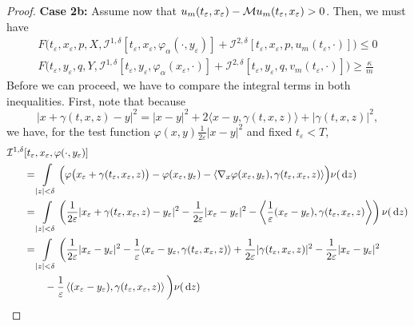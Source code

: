 \begin{proof}
    \textbf{Case 2b:} Assume now that $u_m(t_\varepsilon, x_\varepsilon) - \mathcal{M} u_m(t_\varepsilon, x_\varepsilon) > 0$. Then, we must have 
    \begin{align}
        F \big( t_\varepsilon, x_\varepsilon, p, X, \mathcal I^{1,\delta}[t_\varepsilon, x_\varepsilon, \varphi_\alpha(\cdot, y_\varepsilon)] + \mathcal I^{2,\delta}[t_\varepsilon, x_\varepsilon, p, u_m(t_\varepsilon, \cdot)] \big) \leq 0 \label{eqn: (44) in Seydel} \\
        F \big( t_\varepsilon, y_\varepsilon, q, Y, \mathcal I^{1,\delta}[t_\varepsilon, y_\varepsilon, \varphi_\alpha(x_\varepsilon, \cdot)] + \mathcal I^{2,\delta}[t_\varepsilon, y_\varepsilon, q, v_m(t_\varepsilon, \cdot)] \big) \geq \frac{\kappa}{m} \label{eqn: (45) in Seydel}
    \end{align}
    Before we can proceed, we have to compare the integral terms in both inequalities. First, note that because
    \begin{equation*}
        |x+\gamma(t,x,z)-y|^2 = |x-y|^2 + 2\langle x-y,\gamma(t,x,z)\rangle + |\gamma(t,x,z)|^2,
    \end{equation*}
    we have, for the test function $\varphi(x,y) \frac{1}{2\varepsilon}|x-y|^2$ and fixed $t_\varepsilon < T$,
    \begin{align*}
        \mathcal{I}^{1,\delta} &[t_\varepsilon, x_\varepsilon, \varphi(\cdot, y_\varepsilon)]\\
        & = \int\limits_{|z|<\delta} \Big( \varphi \big( x_\varepsilon + \gamma(t_\varepsilon,x_\varepsilon,z) \big) - \varphi(x_\varepsilon,y_\varepsilon) - \langle \nabla_x \varphi(x_\varepsilon,y_\varepsilon), \gamma(t_\varepsilon,x_\varepsilon,z) \rangle \Big) \nu(\diff z) \\
        &= \int\limits_{|z|<\delta} \left( \frac{1}{2\varepsilon} |x_\varepsilon + \gamma(t_\varepsilon,x_\varepsilon,z) - y_\varepsilon|^2 - \frac{1}{2\varepsilon} |x_\varepsilon - y_\varepsilon|^2 - \left\langle \frac 1 \varepsilon (x_\varepsilon-y_\varepsilon), \gamma(t_\varepsilon,x_\varepsilon,z) \right\rangle \right) \nu(\diff z) \\
        &= \int\limits_{|z|<\delta} \bigg( \frac{1}{2\varepsilon} |x_\varepsilon - y_\varepsilon|^2 - \frac{1}{\varepsilon}\langle x_\varepsilon - y_\varepsilon,\gamma(t_\varepsilon,x_\varepsilon,z) \rangle + \frac{1}{2\varepsilon}|\gamma(t_\varepsilon,x_\varepsilon,z)|^2 - \frac{1}{2\varepsilon} |x_\varepsilon - y_\varepsilon|^2 \\
        & \qquad - \frac 1 \varepsilon \left\langle (x_\varepsilon-y_\varepsilon), \gamma(t_\varepsilon,x_\varepsilon,z) \right\rangle \bigg) \nu(\diff z) \\

\end{align*}
\end{proof}
